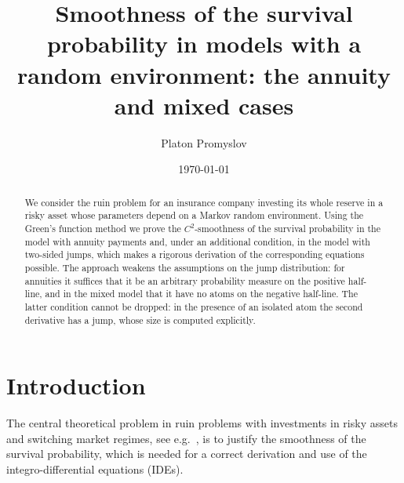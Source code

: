 \documentclass[smallextended]{svjour3}
\begin{document}
\title{Smoothness of the survival probability in models with a random environment: the annuity and mixed cases}

\author{Platon Promyslov}


\date{\today}

\maketitle

\begin{abstract}
We consider the ruin problem for an insurance company investing its whole
reserve in a risky asset whose parameters depend on a Markov random
environment. Using the Green's function method we prove the $C^2$-smoothness
of the survival probability in the model with annuity payments and, under an
additional condition, in the model with two-sided jumps, which makes a
rigorous derivation of the corresponding equations possible. The approach
weakens the assumptions on the jump distribution: for annuities it suffices
that it be an arbitrary probability measure on the positive half-line, and in
the mixed model that it have no atoms on the negative half-line. The latter
condition cannot be dropped: in the presence of an isolated atom the second
derivative has a jump, whose size is computed explicitly.
\end{abstract}

\section{Introduction}
\label{s1}

The central theoretical problem in ruin problems with investments in risky
assets and switching market regimes, see e.g.\
\cite{AntipovKabanov,DiMasi,Paulsen}, is to justify the smoothness of the
survival probability, which is needed for a correct derivation and use of the
integro-differential equations (IDEs).
\end{document}
